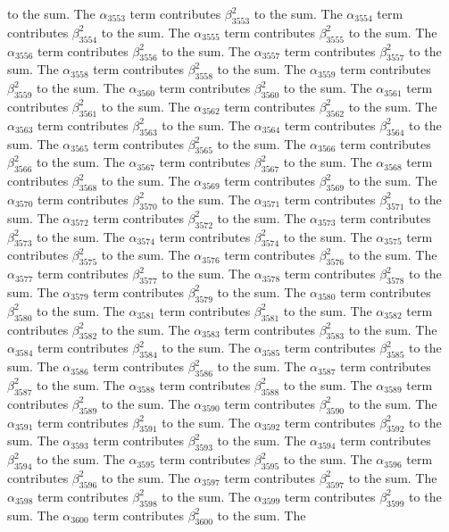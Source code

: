\begin{lemma}
to the sum. The $\alpha_{3553}$ term contributes $\beta_{3553}^{2}$ to the sum. The $\alpha_{3554}$ term contributes $\beta_{3554}^{2}$ to the sum. The $\alpha_{3555}$ term contributes $\beta_{3555}^{2}$ to the sum. The $\alpha_{3556}$ term contributes $\beta_{3556}^{2}$ to the sum. The $\alpha_{3557}$ term contributes $\beta_{3557}^{2}$ to the sum. The $\alpha_{3558}$ term contributes $\beta_{3558}^{2}$ to the sum. The $\alpha_{3559}$ term contributes $\beta_{3559}^{2}$ to the sum. The $\alpha_{3560}$ term contributes $\beta_{3560}^{2}$ to the sum. The $\alpha_{3561}$ term contributes $\beta_{3561}^{2}$ to the sum. The $\alpha_{3562}$ term contributes $\beta_{3562}^{2}$ to the sum. The $\alpha_{3563}$ term contributes $\beta_{3563}^{2}$ to the sum. The $\alpha_{3564}$ term contributes $\beta_{3564}^{2}$ to the sum. The $\alpha_{3565}$ term contributes $\beta_{3565}^{2}$ to the sum. The $\alpha_{3566}$ term contributes $\beta_{3566}^{2}$ to the sum. The $\alpha_{3567}$ term contributes $\beta_{3567}^{2}$ to the sum. The $\alpha_{3568}$ term contributes $\beta_{3568}^{2}$ to the sum. The $\alpha_{3569}$ term contributes $\beta_{3569}^{2}$ to the sum. The $\alpha_{3570}$ term contributes $\beta_{3570}^{2}$ to the sum. The $\alpha_{3571}$ term contributes $\beta_{3571}^{2}$ to the sum. The $\alpha_{3572}$ term contributes $\beta_{3572}^{2}$ to the sum. The $\alpha_{3573}$ term contributes $\beta_{3573}^{2}$ to the sum. The $\alpha_{3574}$ term contributes $\beta_{3574}^{2}$ to the sum. The $\alpha_{3575}$ term contributes $\beta_{3575}^{2}$ to the sum. The $\alpha_{3576}$ term contributes $\beta_{3576}^{2}$ to the sum. The $\alpha_{3577}$ term contributes $\beta_{3577}^{2}$ to the sum. The $\alpha_{3578}$ term contributes $\beta_{3578}^{2}$ to the sum. The $\alpha_{3579}$ term contributes $\beta_{3579}^{2}$ to the sum. The $\alpha_{3580}$ term contributes $\beta_{3580}^{2}$ to the sum. The $\alpha_{3581}$ term contributes $\beta_{3581}^{2}$ to the sum. The $\alpha_{3582}$ term contributes $\beta_{3582}^{2}$ to the sum. The $\alpha_{3583}$ term contributes $\beta_{3583}^{2}$ to the sum. The $\alpha_{3584}$ term contributes $\beta_{3584}^{2}$ to the sum. The $\alpha_{3585}$ term contributes $\beta_{3585}^{2}$ to the sum. The $\alpha_{3586}$ term contributes $\beta_{3586}^{2}$ to the sum. The $\alpha_{3587}$ term contributes $\beta_{3587}^{2}$ to the sum. The $\alpha_{3588}$ term contributes $\beta_{3588}^{2}$ to the sum. The $\alpha_{3589}$ term contributes $\beta_{3589}^{2}$ to the sum. The $\alpha_{3590}$ term contributes $\beta_{3590}^{2}$ to the sum. The $\alpha_{3591}$ term contributes $\beta_{3591}^{2}$ to the sum. The $\alpha_{3592}$ term contributes $\beta_{3592}^{2}$ to the sum. The $\alpha_{3593}$ term contributes $\beta_{3593}^{2}$ to the sum. The $\alpha_{3594}$ term contributes $\beta_{3594}^{2}$ to the sum. The $\alpha_{3595}$ term contributes $\beta_{3595}^{2}$ to the sum. The $\alpha_{3596}$ term contributes $\beta_{3596}^{2}$ to the sum. The $\alpha_{3597}$ term contributes $\beta_{3597}^{2}$ to the sum. The $\alpha_{3598}$ term contributes $\beta_{3598}^{2}$ to the sum. The $\alpha_{3599}$ term contributes $\beta_{3599}^{2}$ to the sum. The $\alpha_{3600}$ term contributes $\beta_{3600}^{2}$ to the sum. The 
\end{lemma}
